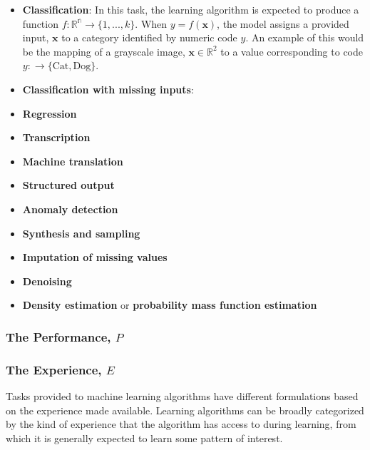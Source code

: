 \begin{itemize}
    \item \textbf{Classification}: In this task, the learning algorithm is
          expected to produce a function $f: \mathbb{R^n}\rightarrow
          \{1,...,k\}$. When $y=f(\mathbf{x})$, the model assigns a provided
          input, $\mathbf{x}$ to a category identified by numeric code $y$. An
          example of this would be the mapping of a grayscale image,
          $\mathbf{x}\in\mathbb{R}^2$ to a value corresponding to code
          $y:\rightarrow\{\textrm{Cat}, \textrm{Dog}\}$.
    \item \textbf{Classification with missing inputs}:
    \item \textbf{Regression}
    \item \textbf{Transcription}
    \item \textbf{Machine translation}
    \item \textbf{Structured output}
    \item \textbf{Anomaly detection}
    \item \textbf{Synthesis and sampling}
    \item \textbf{Imputation of missing values}
    \item \textbf{Denoising}
    \item \textbf{Density estimation} or \textbf{probability mass function estimation}
\end{itemize}


\subsubsection{The Performance, $P$\label{sec:ML-performance}}

\subsubsection{The Experience, $E$\label{sec:ML-experience}}
Tasks provided to machine learning algorithms have different formulations based
on the experience made available. Learning algorithms can be broadly categorized
by the kind of experience that the algorithm has access to during learning, from
which it is generally expected to learn some pattern of interest.

